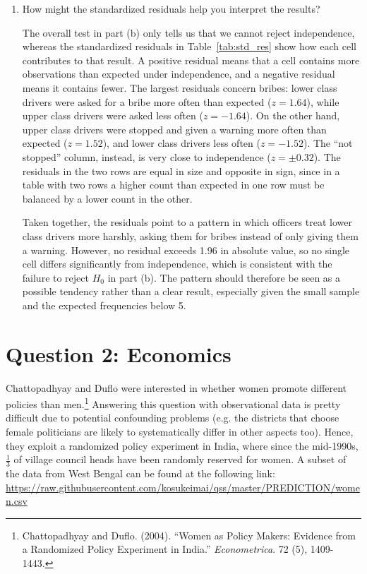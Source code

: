 \documentclass[12pt,letterpaper]{article}
\begin{document}
\begin{enumerate}
		\item [(d)] How might the standardized residuals help you interpret the results?  
		
		\vspace{.25cm}
		\noindent The overall test in part (b) only tells us that we cannot reject independence, whereas the standardized residuals in Table~\ref{tab:std_res} show how each cell contributes to that result. A positive residual means that a cell contains more observations than expected under independence, and a negative residual means it contains fewer. The largest residuals concern bribes: lower class drivers were asked for a bribe more often than expected ($z = 1.64$), while upper class drivers were asked less often ($z = -1.64$). On the other hand, upper class drivers were stopped and given a warning more often than expected ($z = 1.52$), and lower class drivers less often ($z = -1.52$). The ``not stopped'' column, instead, is very close to independence ($z = \pm 0.32$). The residuals in the two rows are equal in size and opposite in sign, since in a table with two rows a higher count than expected in one row must be balanced by a lower count in the other.
		
		\vspace{.25cm}
		\noindent Taken together, the residuals point to a pattern in which officers treat lower class drivers more harshly, asking them for bribes instead of only giving them a warning. However, no residual exceeds 1.96 in absolute value, so no single cell differs significantly from independence, which is consistent with the failure to reject $H_0$ in part (b). The pattern should therefore be seen as a possible tendency rather than a clear result, especially given the small sample and the expected frequencies below 5.
		
		
	\end{enumerate}
	\newpage
	
	\section*{Question 2: Economics}
	Chattopadhyay and Duflo were interested in whether women promote different policies than men.\footnote{Chattopadhyay and Duflo. (2004). ``Women as Policy Makers: Evidence from a Randomized Policy Experiment in India.'' \textit{Econometrica}. 72 (5), 1409-1443.} Answering this question with observational data is pretty difficult due to potential confounding problems (e.g. the districts that choose female politicians are likely to systematically differ in other aspects too). Hence, they exploit a randomized policy experiment in India, where since the mid-1990s, $\frac{1}{3}$ of village council heads have been randomly reserved for women. A subset of the data from West Bengal can be found at the following link: \url{https://raw.githubusercontent.com/kosukeimai/qss/master/PREDICTION/women.csv}
	
\end{document}
